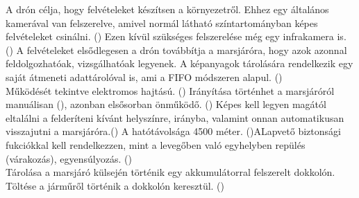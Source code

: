 \documentclass[12pt]{report}
\begin{document}
A drón célja, hogy felvételeket készítsen a környezetről. Ehhez egy általános kamerával van felszerelve, amivel normál látható színtartományban képes felvételeket csinálni. () Ezen kívül szükséges felszerelése még egy infrakamera is. () A felvételeket elsődlegesen a drón továbbítja a marsjáróra, hogy azok azonnal feldolgozhatóak, vizsgálhatóak legyenek. A képanyagok tárolására rendelkezik egy saját átmeneti adattárolóval is, ami a FIFO módszeren alapul. ()\\

Működését tekintve elektromos hajtású. () Irányítása történhet a marsjáróról manuálisan (), azonban elsősorban önműködő. () Képes kell legyen magától eltalálni a felderíteni kívánt helyszínre, irányba, valamint onnan automatikusan visszajutni a marsjáróra.() A hatótávolsága 4500 méter. ()ALapvető biztonsági fukciókkal kell rendelkezzen, mint a levegőben való egyhelyben repülés (várakozás), egyensúlyozás. ()\\

Tárolása a marsjáró külsején történik egy akkumulátorral felszerelt dokkolón. Töltése a járműről történik a dokkolón keresztül. ()
\end{document}

